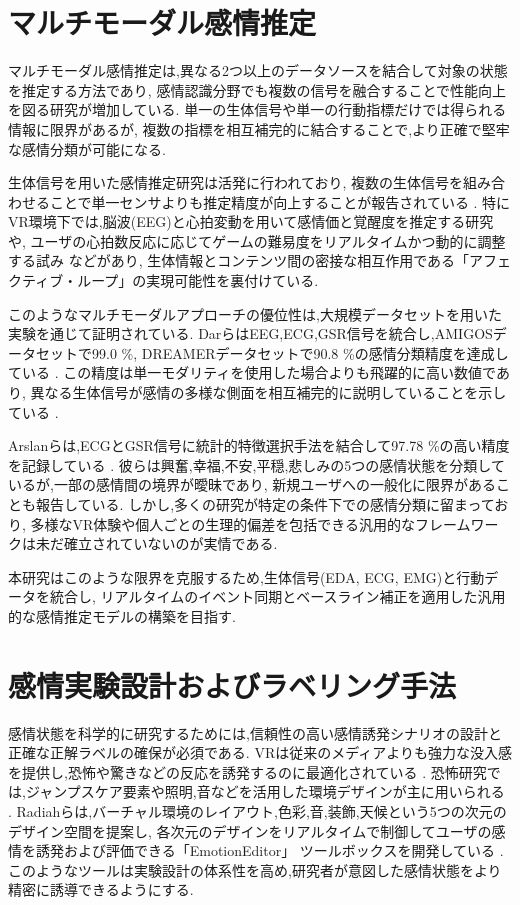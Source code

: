 \documentclass[book,paper=a4,fontsize=10pt,jafontscale=0.92]{jlreq}
\begin{document}
\section{マルチモーダル感情推定}

マルチモーダル感情推定は,異なる2つ以上のデータソースを結合して対象の状態を推定する方法であり,
感情認識分野でも複数の信号を融合することで性能向上を図る研究が増加している.
単一の生体信号や単一の行動指標だけでは得られる情報に限界があるが,
複数の指標を相互補完的に結合することで,より正確で堅牢な感情分類が可能になる.

生体信号を用いた感情推定研究は活発に行われており,
複数の生体信号を組み合わせることで単一センサよりも推定精度が向上することが報告されている \cite{MarinMorales2020, Cimtay2020}.
特にVR環境下では,脳波(EEG)と心拍変動を用いて感情価と覚醒度を推定する研究 \cite{MarinMorales2018}や,
ユーザの心拍数反応に応じてゲームの難易度をリアルタイムかつ動的に調整する試み \cite{OrozcoMora2024}などがあり,
生体情報とコンテンツ間の密接な相互作用である「アフェクティブ・ループ」の実現可能性を裏付けている.

このようなマルチモーダルアプローチの優位性は,大規模データセットを用いた実験を通じて証明されている.
DarらはEEG,ECG,GSR信号を統合し,AMIGOSデータセットで99.0 \%, DREAMERデータセットで90.8 \%の感情分類精度を達成している \cite{Dar2020}.
この精度は単一モダリティを使用した場合よりも飛躍的に高い数値であり,
異なる生体信号が感情の多様な側面を相互補完的に説明していることを示している \cite{Dar2020}.

Arslanらは,ECGとGSR信号に統計的特徴選択手法を結合して97.78 \%の高い精度を記録している \cite{Arslan2024}.
彼らは興奮,幸福,不安,平穏,悲しみの5つの感情状態を分類しているが,一部の感情間の境界が曖昧であり,
新規ユーザへの一般化に限界があることも報告している.
しかし,多くの研究が特定の条件下での感情分類に留まっており,
多様なVR体験や個人ごとの生理的偏差を包括できる汎用的なフレームワークは未だ確立されていないのが実情である.

本研究はこのような限界を克服するため,生体信号(EDA, ECG, EMG)と行動データを統合し,
リアルタイムのイベント同期とベースライン補正を適用した汎用的な感情推定モデルの構築を目指す.

\section{感情実験設計およびラベリング手法}

感情状態を科学的に研究するためには,信頼性の高い感情誘発シナリオの設計と正確な正解ラベルの確保が必須である.
VRは従来のメディアよりも強力な没入感を提供し,恐怖や驚きなどの反応を誘発するのに最適化されている \cite{Liao2020DesignAE}.
恐怖研究では,ジャンプスケア要素や照明,音などを活用した環境デザインが主に用いられる \cite{Dozio2022}.
Radiahらは,バーチャル環境のレイアウト,色彩,音,装飾,天候という5つの次元のデザイン空間を提案し,
各次元のデザインをリアルタイムで制御してユーザの感情を誘発および評価できる「EmotionEditor」 ツールボックスを開発している \cite{Radiah2023}.
このようなツールは実験設計の体系性を高め,研究者が意図した感情状態をより精密に誘導できるようにする.
\end{document}
